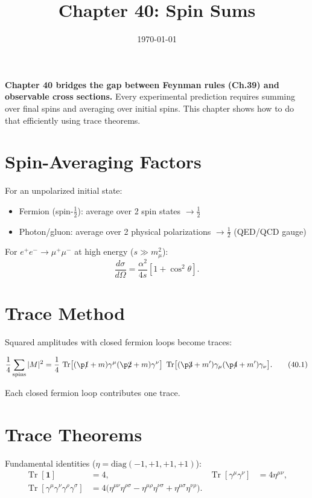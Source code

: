 \documentclass[12pt]{article}
\DeclareMathOperator\Tr{Tr}
\begin{document}
\title{Chapter 40: Spin Sums}
\date{\today}
\maketitle

\begin{mdframed}[backgroundcolor=blue!5]
\textbf{Chapter 40 bridges the gap between Feynman rules (Ch.39) and
observable cross sections.} Every experimental prediction requires
summing over final spins and averaging over initial spins. This chapter
shows how to do that efficiently using trace theorems.
\end{mdframed}

\section{Spin-Averaging Factors}\label{sec:averaging}
For an unpolarized initial state:
\begin{itemize}
\item Fermion (spin-$\frac12$): average over 2 spin states $\to \frac12$
\item Photon/gluon: average over 2 physical polarizations $\to \frac12$ (QED/QCD gauge)
\end{itemize}
For $e^+e^-\to\mu^+\mu^-$ at high energy ($s\gg m_\mu^2$):
\begin{equation}
\frac{d\sigma}{d\Omega}
= \frac{\alpha^2}{4s}\left[1+\cos^2\theta\right] .
\tag{40.$\star$}
\end{equation}

\section{Trace Method}\label{sec:trace_method}
Squared amplitudes with closed fermion loops become traces:
\begin{mdframed}[backgroundcolor=green!5]
\begin{equation}
\frac{1}{4}\sum_{\rm spins}|M|^2
= \frac{1}{4}\,\Tr\bigl[(\p1\!\!\!/+m)\gamma^\mu(\p2\!\!\!/+m)\gamma^\nu\bigr]\;
\Tr\bigl[(\p3\!\!\!/+m')\gamma_\mu(\p4\!\!\!/+m')\gamma_\nu\bigr] .
\tag{40.1}
\end{equation}
\end{mdframed}
Each closed fermion loop contributes one trace.

\section{Trace Theorems}\label{sec:trace_theorems}
Fundamental identities ($\eta=\mathrm{diag}(-1,+1,+1,+1)$):
\begin{align}
\Tr[\mathbf{1}] &= 4, &
\Tr[\gamma^\mu\gamma^\nu] &= 4\eta^{\mu\nu}, \\[2mm]
\Tr[\gamma^\mu\gamma^\nu\gamma^\rho\gamma^\sigma]
&= 4\bigl(\eta^{\mu\nu}\eta^{\rho\sigma}
          -\eta^{\mu\rho}\eta^{\nu\sigma}
          +\eta^{\mu\sigma}\eta^{\nu\rho}\bigr) .
\end{align}
\end{document}
